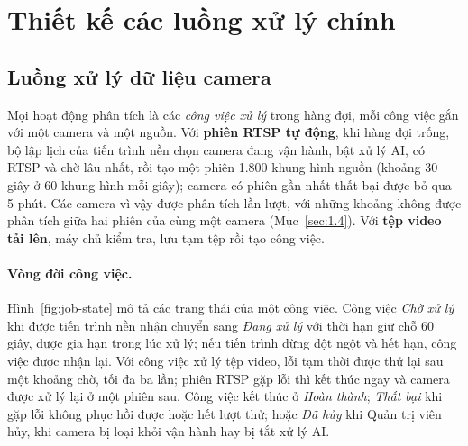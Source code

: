 \section{Thiết kế các luồng xử lý chính}
\label{sec:5.2}

\subsection{Luồng xử lý dữ liệu camera}
\label{sec:5.2.1}

Mọi hoạt động phân tích là các \emph{công việc xử lý} trong hàng đợi, mỗi công việc gắn với một camera và một nguồn. Với \textbf{phiên RTSP tự động}, khi hàng đợi trống, bộ lập lịch của tiến trình nền chọn camera đang vận hành, bật xử lý AI, có RTSP và chờ lâu nhất, rồi tạo một phiên 1.800 khung hình nguồn (khoảng 30 giây ở 60 khung hình mỗi giây); camera có phiên gần nhất thất bại được bỏ qua 5 phút. Các camera vì vậy được phân tích lần lượt, với những khoảng không được phân tích giữa hai phiên của cùng một camera (Mục~\ref{sec:1.4}). Với \textbf{tệp video tải lên}, máy chủ kiểm tra, lưu tạm tệp rồi tạo công việc.

\paragraph{Vòng đời công việc.} Hình~\ref{fig:job-state} mô tả các trạng thái của một công việc. Công việc \emph{Chờ xử lý} khi được tiến trình nền nhận chuyển sang \emph{Đang xử lý} với thời hạn giữ chỗ 60 giây, được gia hạn trong lúc xử lý; nếu tiến trình dừng đột ngột và hết hạn, công việc được nhận lại. Với công việc xử lý tệp video, lỗi tạm thời được thử lại sau một khoảng chờ, tối đa ba lần; phiên RTSP gặp lỗi thì kết thúc ngay và camera được xử lý lại ở một phiên sau. Công việc kết thúc ở \emph{Hoàn thành}; \emph{Thất bại} khi gặp lỗi không phục hồi được hoặc hết lượt thử; hoặc \emph{Đã hủy} khi Quản trị viên hủy, khi camera bị loại khỏi vận hành hay bị tắt xử lý AI.

